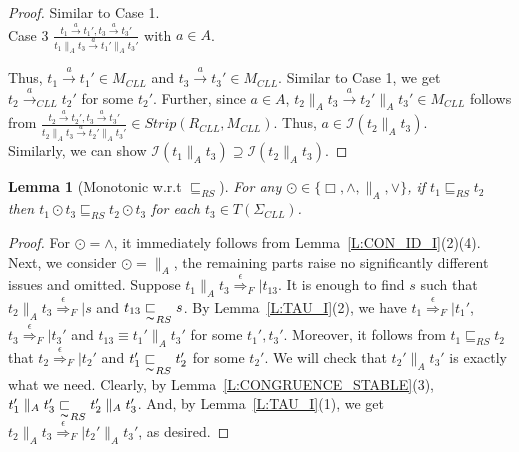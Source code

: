 \documentclass{elsarticle}
\theoremstyle{plain}
\newtheorem{lemma}[theorem]{Lemma}
\theoremstyle{definition}
\begin{document}
\begin{proof}
Similar to Case 1.\\

\noindent    Case 3 $\frac{t_1 \stackrel{a}{\longrightarrow} t_1',t_3 \stackrel{a}{\longrightarrow} t_3'}{t_1 \parallel_A t_3 \stackrel{a}{\longrightarrow} t_1' \parallel_A t_3'}$ with $a \in A$.

    Thus, $t_1 \stackrel{a}{\longrightarrow} t_1'\in M_{CLL}$ and $t_3 \stackrel{a}{\longrightarrow} t_3' \in M_{CLL}$.
    Similar to Case 1, we get $t_2 \stackrel{a}{\longrightarrow}_{CLL} t_2'$ for some $t_2'$.
    Further, since $a\in A$, $t_2 \parallel_A t_3 \stackrel{a}{\longrightarrow} t_2'\parallel_A t_3' \in M_{CLL}$ follows from $\frac{t_2 \stackrel{a}{\longrightarrow} t_2',t_3 \stackrel{a}{\longrightarrow} t_3'}{t_2 \parallel_A t_3 \stackrel{a}{\longrightarrow} t_2' \parallel_A t_3'} \in Strip(R_{CLL}, M_{CLL})$. Thus, $a \in {\mathcal I}(t_2 \parallel_A t_3 )$.\\

    Similarly, we can show ${\mathcal I}(t_1 \parallel_A t_3 ) \supseteq {\mathcal I}(t_2 \parallel_A t_3 )$.
\end{proof}

\begin{lemma}[Monotonic w.r.t $\sqsubseteq_{RS}$]\label{L:CONGRUENCE_PRE}
For any $\odot \in \{\Box,\wedge,\parallel_A,\vee\}$, if $t_1 \sqsubseteq_{RS} t_2$ then $t_1 \odot t_3 \sqsubseteq_{RS} t_2 \odot t_3$ for each $t_3 \in T(\Sigma_{CLL})$.
\end{lemma}
\begin{proof}
  For $\odot = \wedge$, it immediately follows from Lemma~\ref{L:CON_ID_I}(2)(4).
  Next, we consider $\odot = \parallel_A$, the remaining parts raise no significantly different issues and omitted.
    Suppose  $t_1 \parallel_A t_3 \stackrel{\epsilon}{\Longrightarrow}_F|t_{13}$.
    It is enough to find $s$ such that $t_2 \parallel_A t_3 \stackrel{\epsilon}{\Longrightarrow}_F|s$ and $t_{13} \underset{\thicksim}{\sqsubset}_{RS}s$.
    By Lemma~\ref{L:TAU_I}(2), we have $t_1 \stackrel{\epsilon}{\Longrightarrow}_F|t_1'$, $t_3 \stackrel{\epsilon}{\Longrightarrow}_F|t_3'$ and $t_{13}\equiv t_1'\parallel_A t_3'$ for some $t_1',t_3'$.
     Moreover, it follows from $t_1 \sqsubseteq_{RS} t_2$ that $t_2 \stackrel{\epsilon}{\Longrightarrow}_F|t_2'$ and $t_1' \underset{\thicksim}{\sqsubset}_{RS} t_2'$ for some $t_2'$.
    We will check that $t_2' \parallel_A t_3'$ is exactly what we need.
    Clearly, by Lemma~\ref{L:CONGRUENCE_STABLE}(3), $t_1' \parallel_A t_3' \underset{\thicksim}{\sqsubset}_{RS} t_2'\parallel_A t_3'$.
    And, by Lemma~\ref{L:TAU_I}(1), we get $t_2 \parallel_A t_3 \stackrel{\epsilon}{\Longrightarrow}_F|t_2'\parallel_A t_3'$, as desired.
\end{proof}
\end{document}
